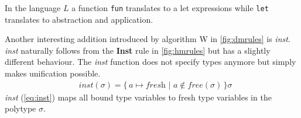 \documentclass[11pt,oneside,a4paper]{report}
\begin{document}
\begin{remark}
In the language $L$ a function \texttt{fun} translates to a let expressions while \texttt{let} translates to abstraction and application.
\end{remark}
Another interesting addition introduced by algorithm W in \autoref{fig:dmrules} is \textit{inst}.
\textit{inst} naturally follows from the \textbf{Inst} rule in \autoref{fig:hmrules} but has a slightly different behaviour.
The \textit{inst} function does not specify types anymore but simply makes unification possible.
\begin{align}
    &\textit{inst}(\sigma) = \{ \, a \mapsto \textit{fresh} \,\,|\,\, a \notin \textit{free}(\sigma) \, \}\sigma
    \label{eq:inst}
\end{align}
\textit{inst} (\autoref{eq:inst}) maps all bound type variables to fresh type variables in the polytype $\sigma$.
\end{document}
